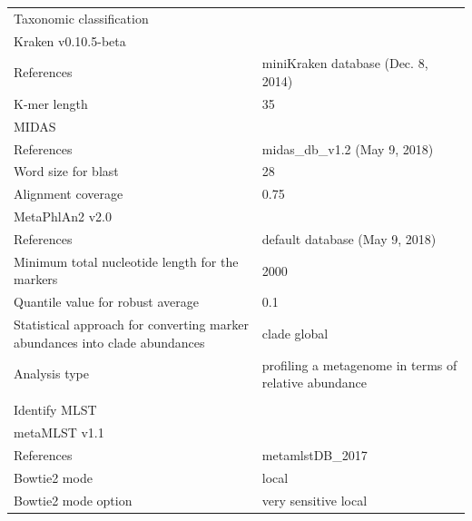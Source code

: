 \begin{table}[]
{\begin{tabular}{ll}
\multicolumn{2}{l}{Taxonomic classification}                                            \\
Kraken v0.10.5-beta                                &                                    \\
References                                         & miniKraken database (Dec. 8, 2014) \\
K-mer length                                       & 35                                 \\
MIDAS                                              &                                    \\
References                                         & midas\_db\_v1.2 (May 9, 2018)      \\
Word size for blast                                & 28                                 \\
Alignment coverage                                 & 0.75                               \\
MetaPhlAn2 v2.0                                    &                                    \\
References                                         & default database (May 9, 2018)     \\
Minimum total nucleotide length for the markers    & 2000                               \\
Quantile value for robust average                  & 0.1                                \\
Statistical approach for converting marker abundances into clade abundances & clade global                                          \\
Analysis type                                                               & profiling a metagenome in terms of relative abundance \\
                                                   &                                    \\
\multicolumn{2}{l}{Identify MLST}                                                       \\
metaMLST v1.1                                      &                                    \\
References                                         & metamlstDB\_2017                   \\
Bowtie2 mode                                       & local                              \\
Bowtie2 mode option                                & very sensitive local               \\

\end{tabular}}
\end{table}
